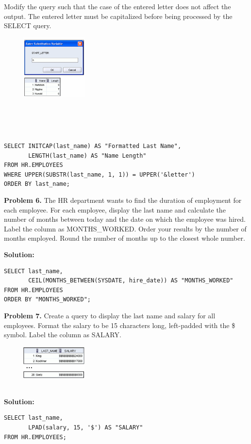 \documentclass[12pt,a4paper]{article}
\begin{document}
Modify the query such that the case of the entered letter does not affect the output. The entered letter must be capitalized before being processed by the SELECT query.
\begin{figure}[htbp]
  \centering
  \includegraphics[width=0.3\textwidth]{Screenshots/35_3.png}
\end{figure}\\
\\
\\\begin{lstlisting}[style=sqlstyle]
SELECT INITCAP(last_name) AS "Formatted Last Name",
       LENGTH(last_name) AS "Name Length"
FROM HR.EMPLOYEES
WHERE UPPER(SUBSTR(last_name, 1, 1)) = UPPER('&letter')
ORDER BY last_name;
\end{lstlisting}

\vspace{0.5cm}

\textbf{Problem 6.} The HR department wants to find the duration of employment for each employee. For each employee, display the last name and calculate the number of months between today and the date on which the employee was hired. Label the column as MONTHS\_WORKED. Order your results by the number of months employed. Round the number of months up to the closest whole number.

\textbf{Solution:}
\begin{lstlisting}[style=sqlstyle]
SELECT last_name,
       CEIL(MONTHS_BETWEEN(SYSDATE, hire_date)) AS "MONTHS_WORKED"
FROM HR.EMPLOYEES
ORDER BY "MONTHS_WORKED";
\end{lstlisting}

\vspace{0.5cm}

\textbf{Problem 7.} Create a query to display the last name and salary for all employees. Format the salary to be 15 characters long, left-padded with the \$ symbol. Label the column as SALARY.
\begin{figure}[htbp]
  \centering
  \includegraphics[width=0.3\textwidth]{Screenshots/37.png}
\end{figure}\\
\textbf{Solution:}
\begin{lstlisting}[style=sqlstyle]
SELECT last_name,
       LPAD(salary, 15, '$') AS "SALARY"
FROM HR.EMPLOYEES;
\end{lstlisting}
\end{document}
